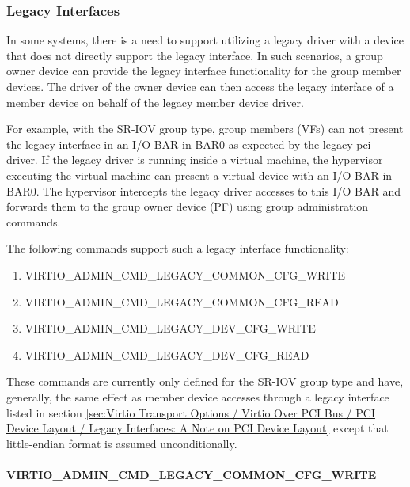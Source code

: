 \subsubsection{Legacy Interfaces}\label{sec:Basic Facilities of a Virtio Device / Device groups / Group
administration commands / Legacy Interface}

In some systems, there is a need to support utilizing a legacy driver with
a device that does not directly support the legacy interface. In such scenarios,
a group owner device can provide the legacy interface functionality for the
group member devices. The driver of the owner device can then access the legacy
interface of a member device on behalf of the legacy member device driver.

For example, with the SR-IOV group type, group members (VFs) can not present
the legacy interface in an I/O BAR in BAR0 as expected by the legacy pci driver.
If the legacy driver is running inside a virtual machine, the hypervisor
executing the virtual machine can present a virtual device with an I/O BAR in
BAR0. The hypervisor intercepts the legacy driver accesses to this I/O BAR and
forwards them to the group owner device (PF) using group administration commands.

The following commands support such a legacy interface functionality:

\begin{enumerate}
\item VIRTIO_ADMIN_CMD_LEGACY_COMMON_CFG_WRITE
\item VIRTIO_ADMIN_CMD_LEGACY_COMMON_CFG_READ
\item VIRTIO_ADMIN_CMD_LEGACY_DEV_CFG_WRITE
\item VIRTIO_ADMIN_CMD_LEGACY_DEV_CFG_READ
\end{enumerate}

These commands are currently only defined for the SR-IOV group type and
have, generally, the same effect as member device accesses through a legacy
interface listed in section \ref{sec:Virtio Transport Options / Virtio Over PCI
Bus / PCI Device Layout / Legacy Interfaces: A Note on PCI Device Layout} except
that little-endian format is assumed unconditionally.

\paragraph{VIRTIO_ADMIN_CMD_LEGACY_COMMON_CFG_WRITE}
\label{par:Basic Facilities of a Virtio Device / Device groups / Group administration commands / Legacy Interface / VIRTIO-ADMIN-CMD-LEGACY-COMMON-CFG-WRITE}

